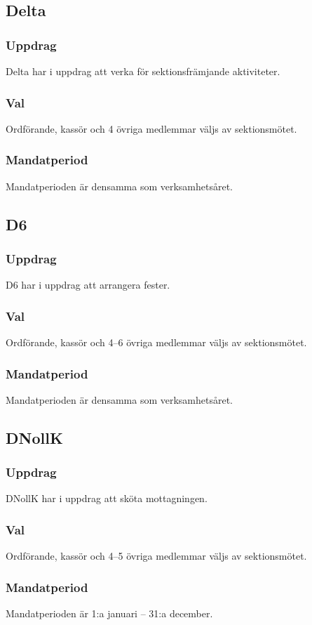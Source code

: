 \subsection{Delta}
\subsubsection{Uppdrag}
Delta har i uppdrag att verka för sektionsfrämjande aktiviteter. 
\subsubsection{Val}
Ordförande, kassör och 4 övriga medlemmar väljs av sektionsmötet. 
\subsubsection{Mandatperiod}
Mandatperioden är densamma som verksamhetsåret. 

\subsection{D6}
\subsubsection{Uppdrag}
D6 har i uppdrag att arrangera fester. 
\subsubsection{Val}
Ordförande, kassör och 4--6 övriga medlemmar väljs av sektionsmötet. 
\subsubsection{Mandatperiod}
Mandatperioden är densamma som verksamhetsåret. 

\subsection{DNollK}
\subsubsection{Uppdrag}
DNollK har i uppdrag att sköta mottagningen. 
\subsubsection{Val}
Ordförande, kassör och 4--5 övriga medlemmar väljs av sektionsmötet. 
\subsubsection{Mandatperiod}
Mandatperioden är 1:a januari – 31:a december.

